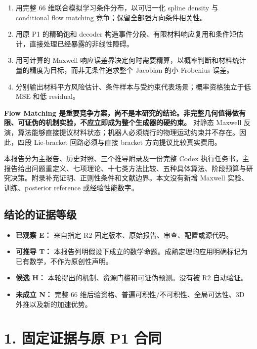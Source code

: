 \documentclass[
  11pt,
  a4paper,
]{article}
\providecommand{\tightlist}{%
  \setlength{\itemsep}{0pt}\setlength{\parskip}{0pt}}
\begin{document}
\begin{enumerate}
\def\labelenumi{\arabic{enumi}.}
\tightlist
\item
  用完整 66 维联合模拟学习条件分布，以可归一化 spline density 与
  conditional flow matching 竞争；保留全部强方向条件相关性。
\item
  用原 P1 的精确饱和 decoder
  构造事件分段、有限材料响应复用和条件矩估计，直接处理已经暴露的非线性障碍。
\item
  用可计算的 Maxwell
  响应误差界决定何时需要精算，以概率判断和材料统计量的精度为目标，而非无条件追求整个
  Jacobian 的小 Frobenius 误差。
\item
  分别输出材料平方风险估计、条件样本与受约束代表场景；概率资格独立于低
  MSE 和低 residual。
\end{enumerate}

\textbf{Flow Matching
是重要竞争方案，尚不是本研究的结论。非完整几何值得做有限、可证伪的机制实验，不应立即成为整个生成器的硬约束。}
对静态 Maxwell
反演，算法能够直接提议材料状态；机器人必须绕行的物理运动约束并不存在。因此，四段
Lie-bracket 回路必须与直接 bracket 方向提议比较真实费用。

本报告分为主报告、历史对照、三个推导附录及一份完整 Codex
执行任务书。主报告给出问题重定义、七项理论、十七类方法比较、五种具体算法、阶段预算与研究决策。附录补充证明、正则性条件和文献边界。本文没有新增
Maxwell 实验、训练、posterior reference 或经验性能数字。

\hypertarget{ux7ed3ux8bbaux7684ux8bc1ux636eux7b49ux7ea7}{%
\subsection{结论的证据等级}\label{ux7ed3ux8bbaux7684ux8bc1ux636eux7b49ux7ea7}}

\begin{itemize}
\tightlist
\item
  \textbf{已观察 E：} 来自指定 R2
  固定版本、原始报告、审查、配置或源代码。
\item
  \textbf{可推导 T：}
  本报告列明假设下成立的数学命题。成熟定理的应用明确标记为已有数学，不作为原创性声明。
\item
  \textbf{候选 H：} 本轮提出的机制、资源门槛和可证伪预测。没有被 R2
  自动验证。
\item
  \textbf{未成立 N：} 完整 66
  维后验资格、普遍可积性/不可积性、全局可达性、3D 外推以及新的加速优势。
\end{itemize}

\hypertarget{ux56faux5b9aux8bc1ux636eux4e0eux539f-p1-ux5408ux540c}{%
\section{1. 固定证据与原 P1
合同}\label{ux56faux5b9aux8bc1ux636eux4e0eux539f-p1-ux5408ux540c}}
\end{document}
